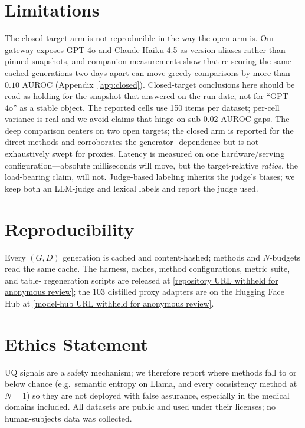 \documentclass[11pt]{article}
\begin{document}
\section*{Limitations}
The closed-target arm is not reproducible in the way the open arm is. Our gateway exposes GPT-4o
and Claude-Haiku-4.5 as version aliases rather than pinned snapshots, and companion measurements
show that re-scoring the same cached generations two days apart can move greedy comparisons by
more than $0.10$ AUROC (Appendix~\ref{app:closed}). Closed-target conclusions here should be
read as holding for the snapshot that answered on the run date, not for ``GPT-4o'' as a stable
object.
The reported cells use 150 items per dataset; per-cell variance is real and we avoid
claims that hinge on sub-0.02 AUROC gaps. The deep comparison centers on two open targets;
the closed arm is reported for the direct methods and corroborates the generator-%
dependence but is not exhaustively swept for proxies. Latency is measured on one
hardware/serving configuration---absolute milliseconds will move, but the target-relative
\emph{ratios}, the load-bearing claim, will not. Judge-based labeling inherits the judge's
biases; we keep both an LLM-judge and lexical labels and report the judge used.

\section*{Reproducibility}
Every $(G,D)$ generation is cached and content-hashed; methods and $N$-budgets read the
same cache. The harness, caches, method configurations, metric suite, and table-%
regeneration scripts are released at \url{[repository URL withheld for anonymous review]}; the
103 distilled proxy adapters are on the Hugging Face Hub at
\url{[model-hub URL withheld for anonymous review]}.

\section*{Ethics Statement}
UQ signals are a safety mechanism; we therefore report where methods fall to or below
chance (e.g.\ semantic entropy on Llama, and every consistency method at $N{=}1$) so they
are not deployed with false assurance, especially in the medical domains included. All
datasets are public and used under their licenses; no human-subjects data was collected.
\end{document}
